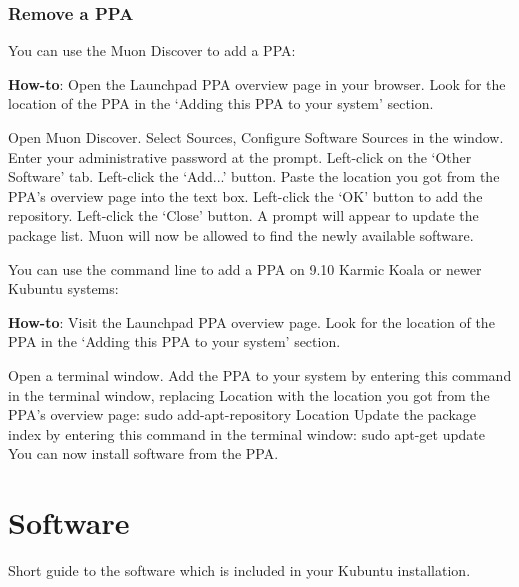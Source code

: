 \documentclass[letterpaper,10pt,english]{sphinxmanual}
\begin{document}
\subsection{Remove a PPA}
\label{docs/repositories:remove-a-ppa}
You can use the Muon Discover to add a PPA:

\textbf{How-to}: Open the Launchpad PPA overview page in your browser. Look for the location of the PPA in the `Adding this PPA to your system' section.

Open Muon Discover. Select Sources, Configure Software Sources in the window. Enter your administrative password at the prompt. Left-click on the `Other Software' tab. Left-click the `Add...' button. Paste the location you got from the PPA's overview page into the text box. Left-click the `OK' button to add the repository. Left-click the `Close' button. A prompt will appear to update the package list. Muon will now be allowed to find the newly available software.

You can use the command line to add a PPA on 9.10 Karmic Koala or newer Kubuntu systems:

\textbf{How-to}: Visit the Launchpad PPA overview page. Look for the location of the PPA in the `Adding this PPA to your system' section.

Open a terminal window. Add the PPA to your system by entering this command in the terminal window, replacing Location with the location you got from the PPA's overview page: sudo add-apt-repository Location Update the package index by entering this command in the terminal window: sudo apt-get update You can now install software from the PPA.


\chapter{Software}
\label{docs/software::doc}\label{docs/software:software-link}\label{docs/software:software}
Short guide to the software which is included in your Kubuntu installation.
\end{document}
